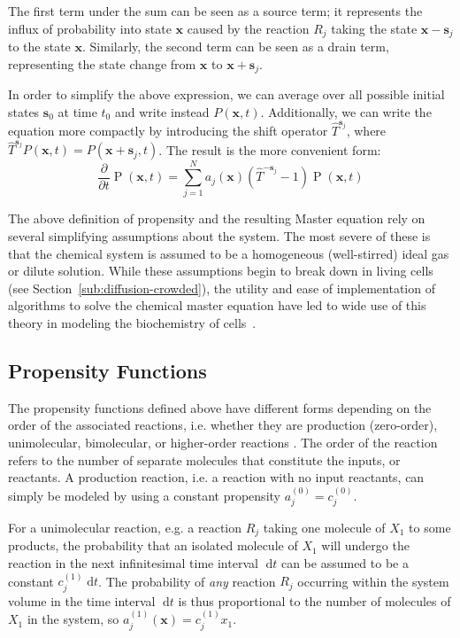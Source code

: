 \documentclass[english,letterpaper,12pt]{article}
\newcommand{\dee}{\;\mathrm{d}}
\renewcommand{\vec}[1]{\ensuremath{\mathbf{#1}}}
\DeclareMathOperator{\Prob}{P}
\begin{document}
\begin{doublespacing}
The first term under the sum can be seen as a source term; it represents the influx of probability into state $\vec{x}$ caused by the reaction $R_j$ taking the state $\vec{x} - \vec{s}_j$ to the state $\vec{x}$. Similarly, the second term can be seen as a drain term, representing the state change from $\vec{x}$ to $\vec{x} + \vec{s}_j$.

In order to simplify the above expression, we can average over all possible initial states $\vec{s}_0$ at time $t_0$ and write instead $P(\vec{x}, t)$. Additionally, we can write the equation more compactly by introducing the shift operator $\hat{T}^{\vec{s}_j}$, where $\hat{T}^{\vec{s}_j} P(\vec{x}, t) = P(\vec{x} + \vec{s}_j, t)$. The result is the more convenient form:
\begin{equation}
    \frac{\partial}{\partial t} \Prob(\vec{x}, t) = \sum_{j=1}^N a_j(\vec{x})(\hat{T}^{-\vec{s}_j} - 1)\Prob(\vec{x}, t)
    \label{eq:master-eqn}
\end{equation}

The above definition of propensity and the resulting Master equation rely on several simplifying assumptions about the system. The most severe of these is that the chemical system is assumed to be a homogeneous (well-stirred) ideal gas or dilute solution.  While these assumptions begin to break down in living cells (see Section~\ref{sub:diffusion-crowded}), the utility and ease of implementation of algorithms to solve the chemical master equation have led to wide use of this theory in modeling the biochemistry of cells~\cite{we-chemkin}\cite{stoch-sys-bio}.

\subsection{Propensity Functions} %
\label{sub:propensities}

The propensity functions defined above have different forms depending on the order of the associated reactions, i.e. whether they are production (zero-order), unimolecular, bimolecular, or higher-order reactions \cite{gillespie-ssa}. The order of the reaction refers to the number of separate molecules that constitute the inputs, or reactants. A production reaction, i.e. a reaction with no input reactants, can simply be modeled by using a constant propensity $a_j^{(0)} = c_j^{(0)}$. 

For a unimolecular reaction, e.g. a reaction $R_j$ taking one molecule of $X_1$ to some products, the probability that an isolated molecule of $X_1$ will undergo the reaction in the next infinitesimal time interval $\dee t$ can be assumed to be a constant $c_j^{(1)} \dee t$. The probability of \emph{any} reaction $R_j$ occurring within the system volume in the time interval $\dee t$ is thus proportional to the number of molecules of $X_1$ in the system, so $a_j^{(1)}(\vec{x}) = c_j^{(1)} x_1$.


\end{doublespacing}
\end{document}
